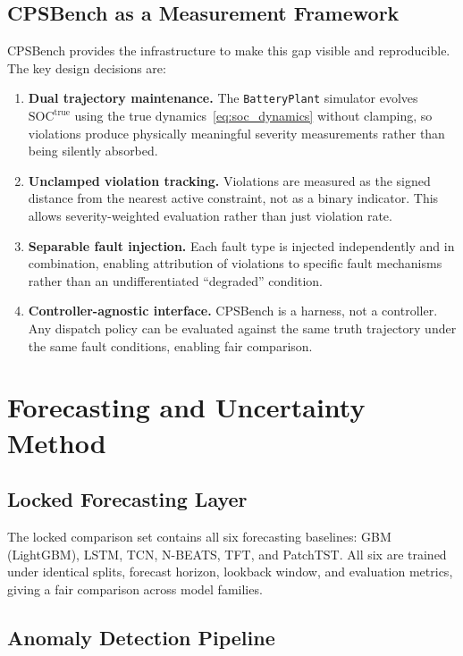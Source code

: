 \documentclass[11pt,a4paper]{article}
\begin{document}
\subsection{CPSBench as a Measurement Framework}

CPSBench provides the infrastructure to make this gap visible and reproducible. The key design decisions are:
\begin{enumerate}[leftmargin=*,topsep=2pt,itemsep=1pt]
  \item \textbf{Dual trajectory maintenance.} The \texttt{BatteryPlant} simulator evolves $\mathrm{SOC}^{\mathrm{true}}$ using the true dynamics~\eqref{eq:soc_dynamics} without clamping, so violations produce physically meaningful severity measurements rather than being silently absorbed.
  \item \textbf{Unclamped violation tracking.} Violations are measured as the signed distance from the nearest active constraint, not as a binary indicator. This allows severity-weighted evaluation rather than just violation rate.
  \item \textbf{Separable fault injection.} Each fault type is injected independently and in combination, enabling attribution of violations to specific fault mechanisms rather than an undifferentiated ``degraded'' condition.
  \item \textbf{Controller-agnostic interface.} CPSBench is a harness, not a controller. Any dispatch policy can be evaluated against the same truth trajectory under the same fault conditions, enabling fair comparison.
\end{enumerate}


\section{Forecasting and Uncertainty Method}\label{sec:forecasting_uq}

\subsection{Locked Forecasting Layer}

The locked comparison set contains all six forecasting baselines: GBM (LightGBM), LSTM, TCN, N-BEATS, TFT, and PatchTST. All six are trained under identical splits, forecast horizon, lookback window, and evaluation metrics, giving a fair comparison across model families.

\subsection{Anomaly Detection Pipeline}
\end{document}
